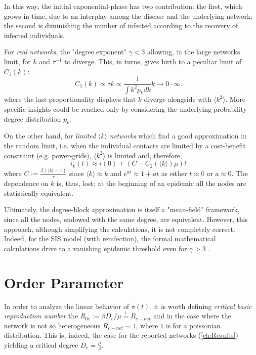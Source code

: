 \documentclass[a4paper,10pt,twoside]{book} %
\theoremstyle{definition}
\begin{document}
In this way, the initial exponential-phase has two contribution: the first, which grows in time, due to an interplay among the disease and the underlying network; the second is diminishing the number of infected according to the recovery of infected individuals.

For \textit{real networks}, the "degree exponent" $\gamma<3$ allowing, in the large networks limit, for $k$ and $\tau^{-1}$ to diverge. This, in turns, gives birth to a peculiar limit of $C_1(k)$: \vspace{3mm}
\begin{equation}
	C_1(k)\propto \tau k \propto \frac{1}{\int k^2 p_k dk}k  \to 0 \cdot \infty.
\end{equation}
where the last proportionality displays that $k$ diverge alongside with $\langle k^2 \rangle$. More specific insights could be reached only by considering the underlying probability degree distribution $p_k$.

On the other hand, for \textit{limited $\langle k \rangle$ networks} which find a good approximation in the random limit, i.e. when the individual contacts are limited by a cost-benefit constraint (e.g. power-grids), $\langle k^2 \rangle $ is limited and, therefore,
\begin{equation}
	i_k(t) \approx i(0)  + \left(C - C_2(\langle k \rangle )\mu \right) t
\end{equation}
where $C:= \frac{\beta (\langle k \rangle -1)}{\tau}$ since $\langle k \rangle \approx k$ and $e^{at}\approx1+at$ as either $t\approx0$ or $a \approx 0$. \vspace{3mm} The dependence on $k$ is, thus, lost: at the beginning of an epidemic all the nodes are statistically equivalent.

Ultimately, the degree-block approximation is itself a "mean-field" framework, since all the nodes, endowed with the same degree, are equivalent. However, this approach, although simplifying the calculations, it is not completely correct. Indeed, for the SIS model (with reinfection), the formal mathematical calculations drive to a vanishing epidemic threshold even for $\gamma>3$ \cite{barabasi::2016networkbook}.

\section{Order Parameter}
\label{sec:OrderParam4LinContagion}
In order to analyze the linear behavior of $\pi(t)$, it is worth defining \textit{critical basic reproduction number} the  $R_{0c} := \beta D_c / \mu \stackrel{!}{=} R_{c-net}$ and in the case where the network is not so heterogeneous $ R_{c-net} \sim 1$, where $1$ is for a poissonian distribution. This is, indeed, the case for the reported networks (\autoref{ch:Results}) yielding a critical degree $D_c = \frac{\mu}{\beta}$. 
\end{document}
